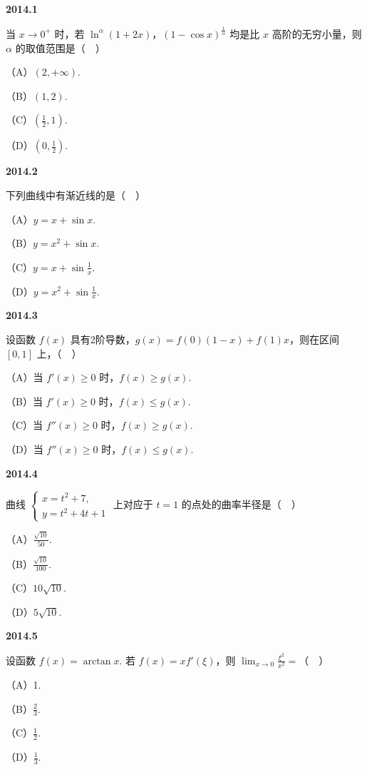 \documentclass[UTF8,12pt,fontset=windows]{ctexart}
\begin{document}
{\large\bfseries 2014.1}

当 $x \to 0^+$ 时，若 $\ln^{\alpha}(1 + 2x)$，$(1 - \cos x)^{\frac{1}{\alpha}}$ 均是比 $x$ 高阶的无穷小量，则 $\alpha$ 的取值范围是（　）

（A）$(2, +\infty)$.

（B）$(1, 2)$.

（C）$\left(\frac{1}{2}, 1\right)$.

（D）$\left(0, \frac{1}{2}\right)$.

\vfill
\newpage
{\large\bfseries 2014.2}

下列曲线中有渐近线的是（　）

（A）$y = x + \sin x$.

（B）$y = x^2 + \sin x$.

（C）$y = x + \sin \frac{1}{x}$.

（D）$y = x^2 + \sin \frac{1}{x}$.

\vfill
\newpage
{\large\bfseries 2014.3}

设函数 $f(x)$ 具有2阶导数，$g(x) = f(0)(1 - x) + f(1)x$，则在区间 $[0, 1]$ 上，（　）

（A）当 $f'(x) \geqslant 0$ 时，$f(x) \geqslant g(x)$.

（B）当 $f'(x) \geqslant 0$ 时，$f(x) \leqslant g(x)$.

（C）当 $f''(x) \geqslant 0$ 时，$f(x) \geqslant g(x)$.

（D）当 $f''(x) \geqslant 0$ 时，$f(x) \leqslant g(x)$.

\vfill
\newpage
{\large\bfseries 2014.4}

曲线 $\begin{cases} x = t^2 + 7, \\ y = t^2 + 4t + 1 \end{cases}$ 上对应于 $t = 1$ 的点处的曲率半径是（　）

（A）$\frac{\sqrt{10}}{50}$.

（B）$\frac{\sqrt{10}}{100}$.

（C）$10\sqrt{10}$.

（D）$5\sqrt{10}$.

\vfill
\newpage
{\large\bfseries 2014.5}

设函数 $f(x) = \arctan x$. 若 $f(x) = xf'(\xi)$，则 $\lim_{x \to 0} \frac{\xi^2}{x^2} =$（　）

（A）1.

（B）$\frac{2}{3}$.

（C）$\frac{1}{2}$.

（D）$\frac{1}{3}$.
\end{document}
